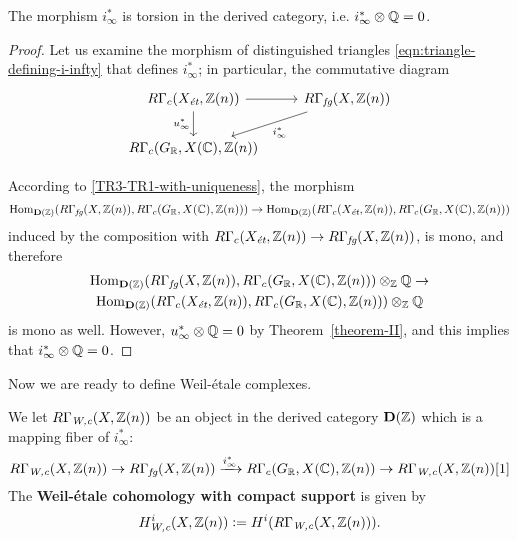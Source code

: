 \documentclass{article}
\numberwithin{equation}{section}
\begin{document}
\begin{proposition}
  \label{i-infty-is-torsion}
  The morphism $i_\infty^*$ is torsion in the derived category,
  i.e. $i_\infty^*\otimes \QQ = 0$.

  \begin{proof}
    Let us examine the morphism of distinguished triangles
    \eqref{eqn:triangle-defining-i-infty} that defines $i_\infty^*$; in
    particular, the commutative diagram
    \[ \begin{tikzcd}
      R\Gamma_c (X_\et, \ZZ (n)) \ar{r}\ar{d}[swap]{u_\infty^*} & R\Gamma_\fg (X, \ZZ (n))\ar{dl}{i_\infty^*} \\
      R\Gamma_c (G_\RR, X (\CC), \ZZ (n))
    \end{tikzcd} \]

    According to \ref{TR3-TR1-with-uniqueness}, the morphism
    \[ \Hom_{\mathbf{D} (\ZZ)} (R\Gamma_\fg (X,\ZZ (n)), R\Gamma_c (G_\RR, X (\CC), \ZZ (n))) \to
    \Hom_{\mathbf{D} (\ZZ)} (R\Gamma_c (X_\et, \ZZ (n)), R\Gamma_c (G_\RR, X (\CC), \ZZ (n))) \]
    induced by the composition with
    $R\Gamma_c (X_\et, \ZZ (n)) \to R\Gamma_\fg (X,\ZZ (n))$, is mono, and
    therefore
    \begin{multline*}
      \Hom_{\mathbf{D} (\ZZ)} (R\Gamma_\fg (X,\ZZ (n)), R\Gamma_c (G_\RR, X (\CC), \ZZ (n)))\otimes_\ZZ \QQ \to\\
      \Hom_{\mathbf{D} (\ZZ)} (R\Gamma_c (X_\et, \ZZ (n)), R\Gamma_c (G_\RR, X (\CC), \ZZ (n)))\otimes_\ZZ \QQ
    \end{multline*}
    is mono as well. However, $u_\infty^*\otimes \QQ = 0$ by
    Theorem~\ref{theorem-II}, and this implies that $i_\infty^*\otimes \QQ = 0$.
  \end{proof}
\end{proposition}

Now we are ready to define Weil-étale complexes.

\begin{definition}
  \label{dfn:RGammaWc}
  We let
  $R\Gamma_\Wc (X,\ZZ(n))$ be an object in the derived category
  $\mathbf{D} (\ZZ)$ which is a mapping fiber of $i_\infty^*$:
  \[ R\Gamma_\Wc (X,\ZZ(n)) \to
  R\Gamma_\fg (X, \ZZ (n)) \xrightarrow{i_\infty^*}
  R\Gamma_c (G_\RR, X (\CC), \ZZ (n)) \to
  R\Gamma_\Wc (X,\ZZ(n)) [1] \]
  The \textbf{Weil-étale cohomology with compact support} is given by
  $$H_\Wc^i (X, \ZZ (n)) \dfn H^i (R\Gamma_\Wc (X,\ZZ(n))).$$
\end{definition}
\end{document}
